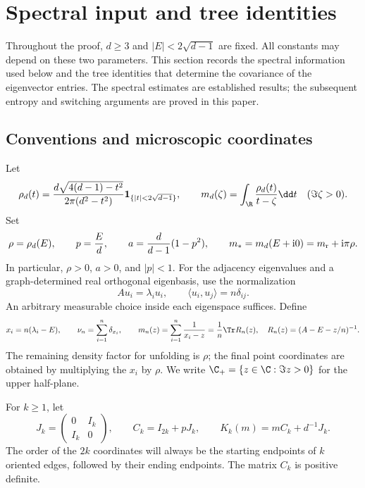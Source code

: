 \section{Spectral input and tree identities}\label{sec:preliminaries}

Throughout the proof, \(d\ge3\) and \(|E|<2\sqrt{d-1}\) are fixed.
All constants may depend on these two parameters.
This section records the spectral information used below and the tree
identities that determine the covariance of the eigenvector entries.
The spectral estimates are established results; the subsequent entropy
and switching arguments are proved in this paper.

\subsection{Conventions and microscopic coordinates}

Let
\[
 \rho_d(t)=
 \frac{d\sqrt{4(d-1)-t^2}}{2\pi(d^2-t^2)}
 \mathbf 1_{\{|t|<2\sqrt{d-1}\}},
 \qquad
 m_d(\zeta)=\int_{\R}\frac{\rho_d(t)}{t-\zeta}\dd t
 \quad(\Im\zeta>0).
\]
Set
\[
 \rho=\rho_d(E),\qquad p=\frac Ed,\qquad
 a=\frac{d}{d-1}(1-p^2),\qquad
 m_*=m_d(E+\mathrm i0)=m_{\rm r}+\mathrm i\pi\rho.
\]
In particular, \(\rho>0\), \(a>0\), and \(|p|<1\).
For the adjacency eigenvalues and a graph-determined real orthogonal
eigenbasis, use the normalization
\[
 Au_i=\lambda_i u_i,\qquad
 \langle u_i,u_j\rangle=n\delta_{ij}.
\]
An arbitrary measurable choice inside each eigenspace suffices.
Define
\begin{equation}\label{eq:micro-coordinates}
 x_i=n(\lambda_i-E),\qquad
 \nu_n=\sum_{i=1}^n\delta_{x_i},\qquad
 m_n(z)=\sum_{i=1}^n\frac1{x_i-z}
       =\frac1n\Tr R_n(z),
 \quad
 R_n(z)=(A-E-z/n)^{-1}.
\end{equation}
The remaining density factor for unfolding is \(\rho\); the final
point coordinates are obtained by multiplying the \(x_i\) by \(\rho\).
We write \(\C_+=\{z\in\C:\Im z>0\}\) for the upper half-plane.

For \(k\ge1\), let
\begin{equation}\label{eq:channel-matrices}
 J_k=\begin{pmatrix}0&I_k\\ I_k&0\end{pmatrix},
 \qquad C_k=I_{2k}+pJ_k,\qquad
 K_k(m)=mC_k+d^{-1}J_k.
\end{equation}
The order of the \(2k\) coordinates will always be the starting endpoints
of \(k\) oriented edges, followed by their ending endpoints.
The matrix \(C_k\) is positive definite.

